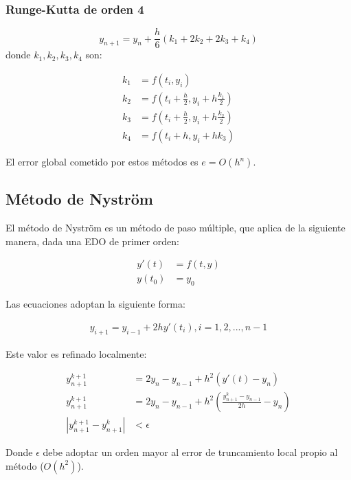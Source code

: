 \documentclass[titlepage,a4paper]{article}
\begin{document}
	\subsubsection{Runge-Kutta de orden 4}

	\begin{equation}
		y_{n+1} = y_n + \frac{h}{6} (k_1 + 2k_2 + 2k_3 + k_4)
	\end{equation}
	donde $ k_1, k_2, k_3, k_4 $ son:

	\begin{align*}
		k_1 &= f(t_i, y_i) \\
		k_2 &= f(t_i + \frac{h}{2}, y_i + h \frac{k_1}{2})\\
		k_3 &= f(t_i + \frac{h}{2}, y_i + h \frac{k_2}{2})\\
		k_4 &= f(t_i + h, y_i + h k_3)
	\end{align*}

	El error global cometido por estos métodos es $ e = O(h^n) $.
 
	\subsection{Método de Nystr\"om}

	El método de Nystr\"om es un método de paso múltiple, que aplica de la siguiente manera, dada una EDO de primer orden:

	\begin{align*}
		y'(t) &= f(t, y)\\
		y(t_{0}) &= y_{0}
	\end{align*}

	Las ecuaciones adoptan la siguiente forma: 

	\begin{align*}
		y_{i+1} = y_{i-1} + 2h y'(t_i), i = 1, 2,..., n - 1
	\end{align*}

	Este valor es refinado localmente:

	\begin{align*}
		y_{n+1}^{k+1} &= 2 y_n - y_{n-1} + h^2 (y'(t) - y_n)\\
		y_{n+1}^{k+1} &= 2 y_n - y_{n-1} + h^2 (\frac{y_{n+1}^k - y_{n-1}}{2h} - y_n)\\
		| y_{n+1}^{k+1} - y_{n+1}^k | &< \epsilon
	\end{align*}

	Donde $\epsilon$ debe adoptar un orden mayor al error de truncamiento local propio al método ($ O(h^2) $).\\
\end{document}
